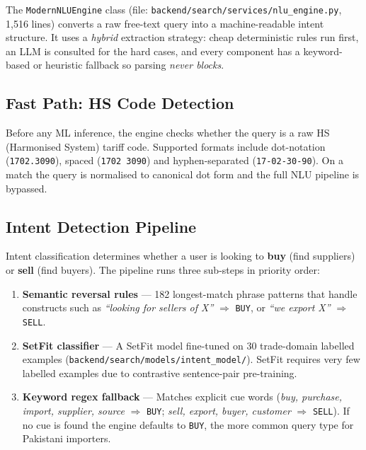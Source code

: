 \documentclass[12pt,a4paper]{article}
\begin{document}
The \texttt{ModernNLUEngine} class (file: \texttt{backend/search/services/nlu\_engine.py},
1,516 lines) converts a raw free-text query into a machine-readable intent structure.
It uses a \emph{hybrid} extraction strategy: cheap deterministic rules run first, an LLM
is consulted for the hard cases, and every component has a keyword-based or heuristic
fallback so parsing \emph{never blocks}.

\subsection{Fast Path: HS Code Detection}

Before any ML inference, the engine checks whether the query is a raw HS (Harmonised
System) tariff code.  Supported formats include dot-notation (\texttt{1702.3090}),
spaced (\texttt{1702 3090}) and hyphen-separated (\texttt{17-02-30-90}).  On a match the
query is normalised to canonical dot form and the full NLU pipeline is bypassed.

\subsection{Intent Detection Pipeline}

Intent classification determines whether a user is looking to \textbf{buy} (find suppliers)
or \textbf{sell} (find buyers).  The pipeline runs three sub-steps in priority order:

\begin{enumerate}
  \item \textbf{Semantic reversal rules} --- 182 longest-match phrase patterns that
        handle constructs such as
        \emph{``looking for sellers of X''} $\Rightarrow$ \texttt{BUY}, or
        \emph{``we export X''} $\Rightarrow$ \texttt{SELL}.
  \item \textbf{SetFit classifier} --- A SetFit model fine-tuned on 30 trade-domain
        labelled examples (\texttt{backend/search/models/intent\_model/}).  SetFit
        requires very few labelled examples due to contrastive sentence-pair pre-training.
  \item \textbf{Keyword regex fallback} --- Matches explicit cue words
        (\emph{buy, purchase, import, supplier, source} $\Rightarrow$ \texttt{BUY};
         \emph{sell, export, buyer, customer} $\Rightarrow$ \texttt{SELL}).
        If no cue is found the engine defaults to \texttt{BUY}, the more common query
        type for Pakistani importers.
\end{enumerate}
\end{document}
